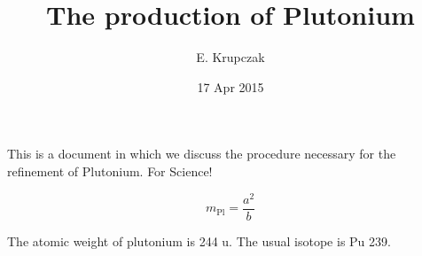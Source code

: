 \documentclass{article}
\title{The production of Plutonium}
\date{17 Apr 2015}
\author{E. Krupczak}
\begin{document}
\maketitle

This is a document in which we discuss the procedure necessary for the refinement of Plutonium. For Science! 

$$m_\text{Pl} = \frac{a^2}{b}$$

The atomic weight of plutonium is 244 u. The usual isotope is Pu 239. 
\end{document}
